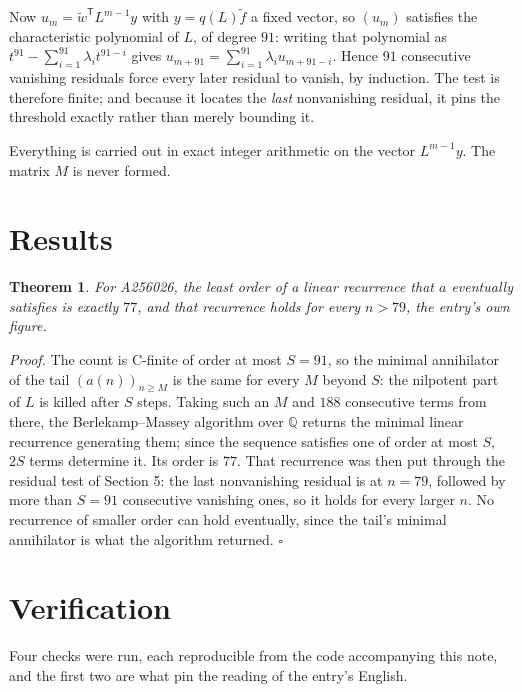 \documentclass[11pt]{article}
\newtheorem{theorem}{Theorem}
\theoremstyle{definition}
\begin{document}
Now $u_m = \tilde w^{\mathsf T} L^{m-1} y$ with $y = q(L)\tilde f$ a fixed vector, so $(u_m)$ satisfies the characteristic polynomial of $L$, of degree $91$: writing that polynomial as $t^{91} - \sum_{i=1}^{91} \lambda_i t^{91-i}$ gives $u_{m+91} = \sum_{i=1}^{91} \lambda_i u_{m+91-i}$. Hence $91$ consecutive vanishing residuals force every later residual to vanish, by induction. The test is therefore finite; and because it locates the {\itshape last} nonvanishing residual, it pins the threshold exactly rather than merely bounding it.

Everything is carried out in exact integer arithmetic on the vector $L^{m-1}y$. The matrix $M$ is never formed.

\section{Results}

\begin{theorem} For A256026, the least order of a linear recurrence that $a$ eventually satisfies is exactly $77$, and that recurrence holds for every $n > 79$, the entry's own figure.\end{theorem}

{\itshape Proof.} The count is C-finite of order at most $S = 91$, so the minimal annihilator of the tail $(a(n))_{n \ge M}$ is the same for every $M$ beyond $S$: the nilpotent part of $L$ is killed after $S$ steps. Taking such an $M$ and $188$ consecutive terms from there, the Berlekamp--Massey algorithm over $\mathbb{Q}$ returns the minimal linear recurrence generating them; since the sequence satisfies one of order at most $S$, $2S$ terms determine it. Its order is $77$. That recurrence was then put through the residual test of Section 5: the last nonvanishing residual is at $n = 79$, followed by more than $S = 91$ consecutive vanishing ones, so it holds for every larger $n$. No recurrence of smaller order can hold eventually, since the tail's minimal annihilator is what the algorithm returned. $\square$

\section{Verification}

Four checks were run, each reproducible from the code accompanying this note, and the first two are what pin the reading of the entry's English.
\end{document}
